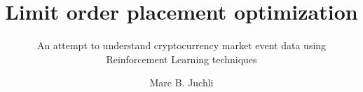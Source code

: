 \documentclass[whitelogo]{tudelft-report}
\begin{document}
\frontmatter


\title[tudelft-white]{Limit order placement optimization}
\subtitle[tudelft-black]{An attempt to understand cryptocurrency market event data using Reinforcement Learning techniques}
\author[tudelft-white]{Marc B. Juchli}








\tableofcontents

\mainmatter









\appendix

%


\end{document}
